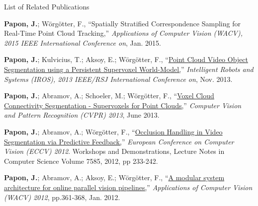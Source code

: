 
\noindent
\begin{flushright}
\huge List of Related Publications
\end{flushright} 
\vspace{50pt} 

\hangindent=1.5cm \textbf{Papon, J.};  Wörgötter, F., ``{Spatially Stratified Correspondence Sampling for Real-Time Point Cloud Tracking,}'' \emph{Applications of Computer Vision (WACV), 2015 IEEE International Conference on}, Jan. 2015. \\
\vspace{6pt}

\hangindent=1.5cm \textbf{Papon, J.};  Kulvicius, T.; Aksoy, E.; Wörgötter, F., ``\href{http://www.dpi.physik.uni-goettingen.de/cns/uploads_bibtexmodule/PDF/paponkulviciusaksoy2013.pdf}{Point Cloud Video Object Segmentation using a Persistent Supervoxel World-Model,}'' \emph{Intelligent Robots and Systems (IROS), 2013 IEEE/RSJ International Conference on}, Nov. 2013. \\
\vspace{6pt}

\hangindent=1.5cm \textbf{Papon, J.};  Abramov, A.; Schoeler, M.; Wörgötter, F., ``\href{http://www.cv-foundation.org/openaccess/content_cvpr_2013/papers/Papon_Voxel_Cloud_Connectivity_2013_CVPR_paper.pdf}{Voxel Cloud Connectivity Segmentation - Supervoxels for Point Clouds,}'' \emph{Computer Vision and Pattern Recognition (CVPR) 2013}, June 2013. \\
\vspace{6pt}

\hangindent=1.5cm \textbf{Papon, J.};  Abramov, A.; Wörgötter, F., ``\href{http://dx.doi.org/10.1007/978-3-642-33885-4_24}{Occlusion Handling in Video Segmentation via Predictive Feedback,}'' \emph{European Conference on Computer Vision (ECCV) 2012}. Workshops and Demonstrations, Lecture Notes in Computer Science Volume 7585, 2012, pp 233-242. \\
\vspace{6pt}

\hangindent=1.5cm \textbf{Papon, J.};  Abramov, A.; Aksoy, E.; Wörgötter, F., ``\href{http://dx.doi.org/10.1109/WACV.2012.6163002}{A modular system architecture for online parallel vision pipelines,}'' \emph{Applications of Computer Vision (WACV) 2012}, pp.361-368, Jan. 2012. \\
\vspace{6pt}

